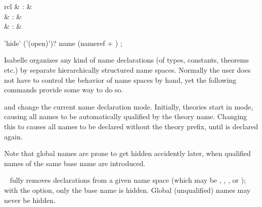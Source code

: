 \begin{isabellebody}
\begin{isamarkuptext}
\begin{descr}
  \end{descr}%
\end{isamarkuptext}%
\isamarkuptrue%
%
\isamarkuptrue%
%
\begin{isamarkuptext}%
\begin{matharray}{rcl}
    \hypertarget{command.global}{\hyperlink{command.global}{\mbox{}}} & : &  \\
    \hypertarget{command.local}{\hyperlink{command.local}{\mbox{}}} & : &  \\
    \hypertarget{command.hide}{\hyperlink{command.hide}{\mbox{}}} & : &  \\
  \end{matharray}

  \begin{rail}
    'hide' ('(open)')? name (nameref + )
    ;
  \end{rail}

  Isabelle organizes any kind of name declarations (of types,
  constants, theorems etc.) by separate hierarchically structured name
  spaces.  Normally the user does not have to control the behavior of
  name spaces by hand, yet the following commands provide some way to
  do so.

  \begin{descr}

  \item [\hyperlink{command.global}{\mbox{\isa{\isacommand{global}}}} and \hyperlink{command.local}{\mbox{\isa{\isacommand{local}}}}] change the
  current name declaration mode.  Initially, theories start in
  \hyperlink{command.local}{\mbox{}} mode, causing all names to be automatically
  qualified by the theory name.  Changing this to \hyperlink{command.global}{\mbox{}}
  causes all names to be declared without the theory prefix, until
  \hyperlink{command.local}{\mbox{}} is declared again.
  
  Note that global names are prone to get hidden accidently later,
  when qualified names of the same base name are introduced.
  
  \item [\hyperlink{command.hide}{\mbox{\isa{\isacommand{hide}}}}~\isa{{\isachardoublequote}space\ names{\isachardoublequote}}] fully removes
  declarations from a given name space (which may be ,
  , , or ); with the  option, only the base name is hidden.  Global
  (unqualified) names may never be hidden.
  

\end{descr}
\end{isamarkuptext}
\end{isabellebody}
